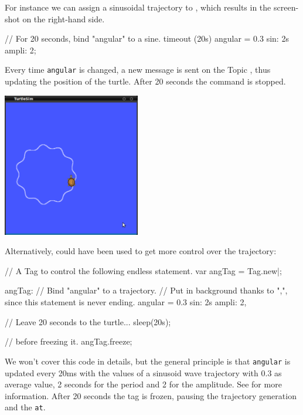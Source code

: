 \begin{multicols}{2}
  For instance we can assign a sinusoidal trajectory to ,
  which results in the screen-shot on the right-hand side.

\begin{urbiunchecked}[xrightmargin=0cm,xleftmargin=0cm]
// For 20 seconds, bind "angular" to a sine.
timeout (20s)
  angular = 0.3 sin: 2s ampli: 2;
\end{urbiunchecked}

Every time \lstinline{angular} is changed, a new message is sent on the
Topic , thus updating the position of the
turtle.  After 20 seconds the command is stopped.

\columnbreak

\begin{center}
  \includegraphics[width=0.45\textwidth]{img/turtlesim-tutorial}
\end{center}

\end{multicols}

\bigskip

Alternatively,  could have been used to get more
control over the trajectory:

\begin{urbiunchecked}
// A Tag to control the following endless statement.
var angTag = Tag.new|;

angTag:
  // Bind "angular" to a trajectory.
  // Put in background thanks to ",", since this statement is never ending.
  angular = 0.3 sin: 2s ampli: 2,

// Leave 20 seconds to the turtle...
sleep(20s);

// before freezing it.
angTag.freeze;
\end{urbiunchecked}

We won't cover this code in details, but the general principle is that
\lstinline{angular} is updated every 20ms with the values of a sinusoid wave
trajectory with 0.3 as average value, 2 seconds for the period and 2 for the
amplitude.  See  for more information.  After
20 seconds the tag is frozen, pausing the trajectory generation and the
\lstinline{at}.



